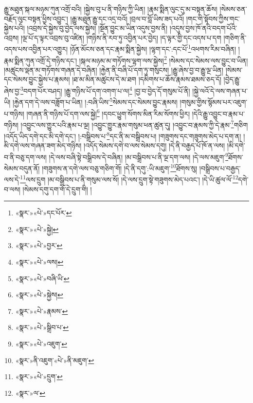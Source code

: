 རྒྱུ་མཐུན་སྐལ་མཉམ་ཀུན་འགྲོ་བའི། །སྐྱེས་བུ་པ་ནི་གཉིས་ཀྱི་ཡིན། །རྣམ་སྨིན་ལུང་དུ་མ་བསྟན་ཆོས། །སེམས་ཅན་བརྗོད་ལུང་བསྟན་ཕྱིས་འབྱུང་། །རྒྱུ་མཐུན་རྒྱུ་དང་འདྲ་བའོ། །བྲལ་བ་བློ་ཡིས་ཟད་པའོ། །གང་གི་སྟོབས་ཀྱིས་གང་སྐྱེས་པའི། །འབྲས་དེ་སྐྱེས་བུ་བྱེད་ལས་སྐྱེས། །སྔོན་བྱུང་མ་ཡིན་འདུས་བྱས་ནི། །འདུས་བྱས་ཁོ་ནའི་བདག་པོའི་འབྲས། །ལྔ་པོ་ད་ལྟར་འབྲས་བུ་འཛིན། །གཉིས་ནི་རབ་ཏུ་འབྱིན་པར་བྱེད། །ད་ལྟར་གྱི་དང་འདས་པ་དག །གཅིག་ནི་འདས་པས་འབྱིན་པར་འགྱུར། །ཉོན་མོངས་ཅན་དང་རྣམ་སྨིན་སྐྱེས། །ལྷག་དང་:དང་པོ་\footnote{«སྣར་»«པེ་»དང་པོར་}འཕགས་རིམ་བཞིན། །རྣམ་སྨིན་ཀུན་འགྲོ་དེ་གཉིས་དང་། །སྐལ་མཉམ་མ་གཏོགས་ལྷག་ལས་སྐྱེས།\footnote{«སྣར་»«པེ་»སྐྱེ།} །སེམས་དང་སེམས་ལས་བྱུང་བ་ཡིན། །མཚུངས་ལྡན་མ་གཏོགས་གཞན་དེ་བཞིན། །རྐྱེན་ནི་བཞི་པོ་དག་ཏུ་གསུངས། །རྒྱུ་ཞེས་བྱ་བ་རྒྱུ་ལྔ་ཡིན། །སེམས་དང་སེམས་བྱུང་སྐྱེས་པ་རྣམས། །ཐ་མ་མིན་མཚུངས་དེ་མ་ཐག །དམིགས་པ་ཆོས་རྣམས་ཐམས་ཅད་དོ། །བྱེད་རྒྱུ་ཞེས་བྱ་\footnote{«སྣར་»«པེ་»བྱར་}བདག་པོར་བཤད། །རྒྱུ་གཉིས་པོ་དག་འགག་པ་ལ།\footnote{«སྣར་»«པེ་»ལས།} །བྱ་བ་བྱེད་དོ་གསུམ་པོ་ནི། །སྐྱེ་ལའོ་དེ་ལས་གཞན་པ་ཡི། །རྐྱེན་དག་དེ་ལས་བཟློག་པ་ཡིན། །:བཞི་ཡིས་\footnote{«སྣར་»«པེ་»བཞི་ཡི་}སེམས་དང་སེམས་བྱུང་རྣམས། །གསུམ་གྱིས་སྙོམས་པར་འཇུག་པ་གཉིས། །གཞན་ནི་གཉིས་པོ་དག་ལས་སྐྱེ།\footnote{«སྣར་»«པེ་»སྐྱེས།} །དབང་ཕྱུག་སོགས་མིན་རིམ་སོགས་ཕྱིར། །དེའི་རྒྱུ་འབྱུང་བ་རྣམ་པ་གཉིས། །འབྱུང་ལས་གྱུར་པའི་རྣམ་པ་ལྔ། །འབྱུང་གྱུར་རྣམ་གསུམ་ཕན་ཚུན་དུ། །འབྱུང་བ་རྣམས་ཀྱི་དེ་རྣམ་\footnote{«སྣར་»«པེ་»རྣམས་}གཅིག །འདོད་ཡིད་དགེ་དང་མི་དགེ་དང་། །:བསྒྲིབས་པ་\footnote{«སྣར་»«པེ་»སྒྲིབ་པ་}དང་ནི་མ་བསྒྲིབས་པ། །གཟུགས་དང་གཟུགས་མེད་པ་དག་ན། །མི་དགེ་ལས་གཞན་ཟག་མེད་གཉིས། །འདོད་སེམས་དགེ་བ་ལས་སེམས་དགུ། །དེ་ནི་བརྒྱད་པོ་ཁོ་ན་ལས། །མི་དགེ་བ་ནི་བཅུ་དག་ལས། །དེ་ལས་བཞི་སྟེ་བསྒྲིབས་དེ་བཞིན། །མ་བསྒྲིབས་པ་ནི་ལྔ་དག་ལས། །དེ་ལས་མཇུག་\footnote{«སྣར་»«པེ་»འཇུག་}ཐོགས་སེམས་བདུན་ནོ། །གཟུགས་ན་དགེ་ལས་བཅུ་གཅིག་གོ། །དེ་ནི་དགུ་:ཡི་མཇུག་\footnote{«སྣར་»ནི་འཇུག་«པེ་»ནི་མཇུག་}ཐོགས་སུ། །བསྒྲིབས་པ་བརྒྱད་ལས་དེ་\footnote{«སྣར་»«པེ་»དྲུག་}ལས་དྲུག །མ་བསྒྲིབས་པ་ནི་གསུམ་ལས་སོ། །དེ་ལས་དྲུག་སྟེ་གཟུགས་མེད་པའང་། །དེ་ཡི་ཚུལ་ལོ་\footnote{«སྣར་»ལ་}དགེ་བ་ལས། །སེམས་དགུ་དག་གོ་དེ་དྲུག་གི། །
